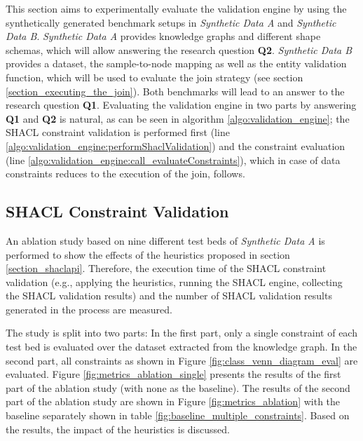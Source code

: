 
This section aims to experimentally evaluate the validation engine by using the synthetically generated benchmark setups in \textit{Synthetic Data A} and \textit{Synthetic Data B}. \textit{Synthetic Data A} provides knowledge graphs and different shape schemas, which will allow answering the research question \textbf{Q2}. \textit{Synthetic Data B} provides a dataset, the sample-to-node mapping as well as the entity validation function, which will be used to evaluate the join strategy (see section \ref{section_executing_the_join}). Both benchmarks will lead to an answer to the research question \textbf{Q1}.
Evaluating the validation engine in two parts by answering \textbf{Q1} and \textbf{Q2} is natural, as can be seen in algorithm \ref{algo:validation_engine}; the SHACL constraint validation is performed first (line \ref{algo:validation_engine:performShaclValidation}) and the constraint evaluation (line \ref{algo:validation_engine:call_evaluateConstraints}), which in case of data constraints reduces to the execution of the join, follows.

\subsection{SHACL Constraint Validation}
\label{section_evaluation_validation_engine_shacl}
An ablation study based on nine different test beds of \textit{Synthetic Data A} is performed to show the effects of the heuristics proposed in section \ref{section_shaclapi}. Therefore, the execution time of the SHACL constraint validation (e.g., applying the heuristics, running the SHACL engine, collecting the SHACL validation results) and the number of SHACL validation results generated in the process are measured.

The study is split into two parts: In the first part, only a single constraint of each test bed is evaluated over the dataset extracted from the knowledge graph. In the second part, all constraints as shown in Figure \ref{fig:class_venn_diagram_eval} are evaluated. Figure \ref{fig:metrics_ablation_single} presents the results of the first part of the ablation study (with none as the baseline). The results of the second part of the ablation study are shown in Figure \ref{fig:metrics_ablation} with the baseline separately shown in table \ref{fig:baseline_multiple_constraints}. Based on the results, the impact of the heuristics is discussed.


